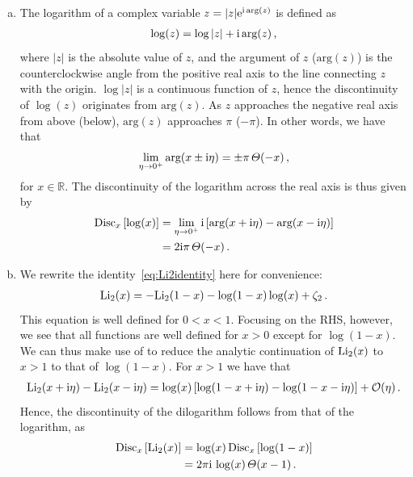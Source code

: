 \begin{enumerate}[a)]

\item The logarithm of a complex variable $z = |z| \text{e}^{\mathrm{i} \, \text{arg}(z)}$ is defined as
\begin{align}
\log(z) = \log|z| + \mathrm{i} \, \text{arg}(z) \,,
\end{align}
where $|z|$ is the absolute value of $z$, and the argument of $z$ ($\text{arg}(z)$) is the counterclockwise angle from the positive real axis to the line connecting $z$ with the origin. $\log|z|$ is a continuous function of $z$, hence the discontinuity of $\log(z)$ originates from $\text{arg}(z)$. As $z$ approaches the negative real axis from above (below), $\text{arg}(z)$ approaches $\pi$ ($-\pi$). In other words, we have that
\begin{align}
 \lim_{\eta\to 0^+}\text{arg} (x \pm \i \eta) = \pm \pi \, \Theta(-x)  \,,
\end{align}
for $x \in \mathbb{R}$.
The discontinuity of the logarithm across the real axis is thus given by
\begin{align}
\begin{aligned}
\text{Disc}_x \left[ \log (x) \right] & = \lim_{\eta\to 0^+} \i \left[ \text{arg}(x+\i \eta) -  \text{arg}(x-\i \eta) \right] \\
 & = 2\i \pi \, \Theta(-x) \,.
 \end{aligned}
\end{align}

\item We rewrite the identity~\eqref{eq:Li2identity} here for convenience:
\begin{align} \label{eq:Li2identitySol}
{\rm Li}_2(x) = - {\rm Li}_2(1-x) - \log(1-x) \log(x) + \zeta_2 \,.
\end{align}
This equation is well defined for $0<x<1$. 
Focusing on the RHS, however, we see that all functions are well defined for $x>0$ except for $\log(1-x)$.
We can thus make use of  to reduce the analytic continuation of ${\rm Li}_2(x)$ to $x>1$ 
to that of $\log(1-x)$. For $x>1$ we have that
\begin{align}
{\rm Li}_2(x + \mathrm{i} \eta) - {\rm Li}_2(x - \mathrm{i} \eta) = \log(x) \left[ \log(1-x+\mathrm{i} \eta ) - \log(1-x-\mathrm{i} \eta) \right] + \mathcal{O}(\eta) \,.
\end{align}
Hence, the discontinuity of the dilogarithm follows from that of the logarithm, as
\begin{align}
\text{Disc}_x \left[ {\rm Li}_2 (x) \right] & = \log (x) \, \text{Disc}_x \left[ \log(1-x) \right]  \nonumber \\
& = 2 \pi \i \, \log(x) \, \Theta(x-1) \,.
\end{align}

\end{enumerate}



